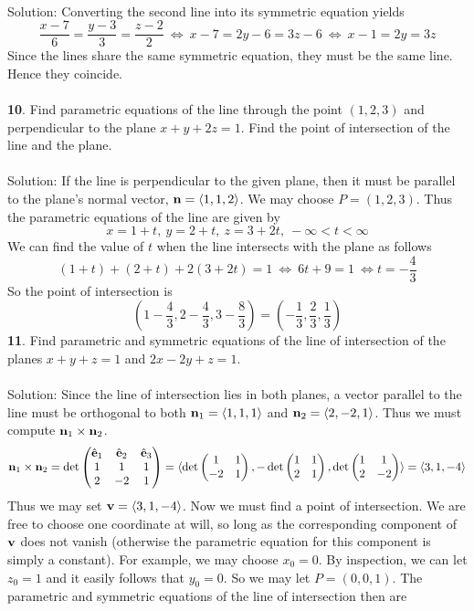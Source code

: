 \documentclass[12pt]{amsbook}
\newcommand{\la}{\langle}
\newcommand{\ra}{\rangle}
\begin{document}
\\
{\sc Solution}: Converting the second line into its symmetric equation yields
$$\frac{x-7}{6}=\frac{y-3}{3}=\frac{z-2}{2} \ \Leftrightarrow \ x-7=2y-6=3z-6 \ \Leftrightarrow \ x-1=2y=3z$$
Since the lines share the same symmetric equation, they must be the same line. Hence they coincide.
\\
\\
{\small\bf 10}. Find parametric equations of the line through the point
$(1,2,3)$ and perpendicular to the plane $x+y+2z=1$. Find the
point of intersection of the line and the plane.\\
\\
{\sc Solution}: If the line is perpendicular to the given plane, then it must be parallel to the plane's normal vector, ${\bf n}=\la 1,1,2\ra$. We may choose $P=(1,2,3)$. Thus the parametric equations of the line are given by
 $$x=1+t, \ y=2+t, \ z=3+2t, \ -\infty<t<\infty$$
 We can find the value of $t$ when the line intersects with the plane as follows
$$(1+t)+(2+t)+2(3+2t)=1 \ \Leftrightarrow \ 6t+9=1 \ \Leftrightarrow t=-\frac{4}{3}$$
So the point of intersection is 
$$(1-\frac{4}{3},2-\frac{4}{3},3-\frac{8}{3})=(-\frac{1}{3},\frac{2}{3},\frac{1}{3})$$   
{\small\bf 11}. Find parametric and symmetric equations of the line of
intersection of the planes $x+y+z=1$ and $2x-2y+z=1$.\\
\\
{\sc Solution}: Since the line of intersection lies in both planes, a vector parallel to the line must be orthogonal to both ${\bf n}_1=\la 1,1,1 \ra$ and ${\bf n}_2=\la 2,-2,1 \ra$. Thus we must compute ${\bf n}_1\times{\bf n}_2$.
$${\bf n}_1\times{\bf n}_2=\det
\begin{pmatrix}
\hat{\bf e}_1 & \hat{\bf e}_2 & \hat{\bf e}_3\cr 1&1&1\cr 2&-2&1 \end{pmatrix}=\la \det\begin{pmatrix}1&1\cr -2&1  \end{pmatrix}, -\det\begin{pmatrix}1&1\cr 2&1  \end{pmatrix}, \det\begin{pmatrix}1&1\cr 2&-2 \end{pmatrix} \ra = \la 3,1,-4 \ra$$
Thus we may set ${\bf v}=\la 3,1,-4\ra$. Now we must find a point of intersection. We are free to choose one coordinate at will, so long as the corresponding component of ${\bf v}$ does not vanish (otherwise the parametric equation for this component is simply a constant). For example, we may choose $x_0=0$. By inspection, we can let $z_0=1$ and it easily follows that $y_0=0$. So we may let $P=(0,0,1)$. The parametric and symmetric equations of the line of intersection then are
\end{document}
